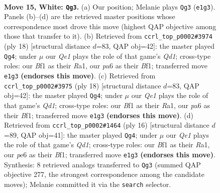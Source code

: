 \documentclass[11pt]{article}
\begin{document}
\clearpage

\begin{figure}[p]\centering
\begin{subfigure}{0.46\textwidth}\centering
\resizebox{\linewidth}{!}{%
\newchessgame
\chessboard[
  setfen={rnb1r3/2pnqkpp/pp2p3/3pPp2/3P1P1P/8/PPPKN1P1/1R2QBNR w - - 4 15},
  showmover=false,
  pgfstyle=straightmove, color=movearrow, markmove={e1-g3}
]}
\caption{}
\end{subfigure}\hfill
\begin{subfigure}{0.46\textwidth}\centering
\resizebox{\linewidth}{!}{%
\newchessgame
\chessboard[
  setfen={rnb1k2r/pppnqppp/4p3/3pP3/3P4/2N3PN/PPP2P2/R2QKB1R w KQkq - 1 10},
  showmover=false,
  pgfstyle=straightmove, color=movearrow, markmove={d1-g4}
]}
\caption{}
\end{subfigure}
\\[4pt]
\begin{subfigure}{0.46\textwidth}\centering
\resizebox{\linewidth}{!}{%
\newchessgame
\chessboard[
  setfen={rnb1k2r/pppnqppp/4p3/3pP3/3P4/2N3PN/PPP2P2/R2QKB1R w KQkq - 1 10},
  showmover=false,
  pgfstyle=straightmove, color=movearrow, markmove={d1-g4}
]}
\caption{}
\end{subfigure}\hfill
\begin{subfigure}{0.46\textwidth}\centering
\resizebox{\linewidth}{!}{%
\newchessgame
\chessboard[
  setfen={rnb1k2r/pppnqppp/4p3/3pP3/3P4/2N4N/PPP2PP1/R2QKB1R w KQkq - 2 9},
  showmover=false,
  pgfstyle=straightmove, color=movearrow, markmove={d1-g4}
]}
\caption{}
\end{subfigure}
\caption{\textbf{Move 15, White: \texttt{Qg3}.} (a) Our position; Melanie plays \texttt{Qg3} (\texttt{e1g3}). Panels (b)--(d) are the retrieved master positions whose correspondence most drove this move (highest QAP objective among those that transfer to it). (b) Retrieved from \texttt{ccrl\_top\_p0002\#3974} (ply 18) [structural distance $d$=83, QAP obj=42]: the master played \texttt{Qg4}; under $\mu$ our \emph{Qe1} plays the role of that game's \emph{Qd1}; cross-type roles: our \emph{B}f1 as their \emph{R}a1, our \emph{p}a6 as their \emph{B}f1; transferred move \texttt{e1g3} \textbf{(endorses this move)}. (c) Retrieved from \texttt{ccrl\_top\_p0002\#3975} (ply 18) [structural distance $d$=83, QAP obj=42]: the master played \texttt{Qg4}; under $\mu$ our \emph{Qe1} plays the role of that game's \emph{Qd1}; cross-type roles: our \emph{B}f1 as their \emph{R}a1, our \emph{p}a6 as their \emph{B}f1; transferred move \texttt{e1g3} \textbf{(endorses this move)}. (d) Retrieved from \texttt{ccrl\_top\_p0002\#1464} (ply 16) [structural distance $d$=89, QAP obj=41]: the master played \texttt{Qg4}; under $\mu$ our \emph{Qe1} plays the role of that game's \emph{Qd1}; cross-type roles: our \emph{B}f1 as their \emph{R}a1, our \emph{p}e6 as their \emph{B}f1; transferred move \texttt{e1g3} \textbf{(endorses this move)}. Synthesis: 8 retrieved analogs transferred to \texttt{Qg3} (summed QAP objective 277, the strongest correspondence among the candidate moves); Melanie committed it via the \texttt{search} selector.}
\label{fig:thought-m28}
\end{figure}
\end{document}
